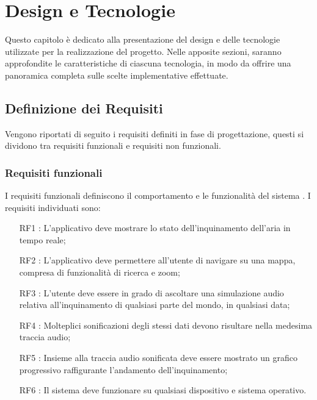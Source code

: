 \clearpage{\pagestyle{empty}\cleardoublepage}
\chapter{Design e Tecnologie}                %

Questo capitolo è dedicato alla presentazione del design e delle tecnologie utilizzate per la realizzazione del progetto.
Nelle apposite sezioni, saranno approfondite le caratteristiche di ciascuna tecnologia, in modo da offrire una panoramica completa sulle scelte implementative effettuate.


\section{Definizione dei Requisiti}
Vengono riportati di seguito i requisiti definiti in fase di progettazione, questi si dividono tra requisiti funzionali e requisiti non funzionali.
\subsection{Requisiti funzionali}
I requisiti funzionali definiscono il comportamento e le funzionalità del sistema \cite{requisiti}.
I requisiti individuati sono:
\begin{itemize}
    \item[RF1]: L'applicativo deve mostrare lo stato dell'inquinamento dell'aria in tempo reale;
    \item[RF2]: L'applicativo deve permettere all'utente di navigare su una mappa, compresa di funzionalità di ricerca e zoom;
    \item[RF3]: L'utente deve essere in grado di ascoltare una simulazione audio relativa all'inquinamento di qualsiasi parte del mondo, in qualsiasi data;
    \item[RF4]: Molteplici sonificazioni degli stessi dati devono risultare nella medesima traccia audio;
    \item[RF5]: Insieme alla traccia audio sonificata deve essere mostrato un grafico progressivo raffigurante l'andamento dell'inquinamento;
    \item[RF6]: Il sistema deve funzionare su qualsiasi dispositivo e sistema operativo.
\end{itemize}

